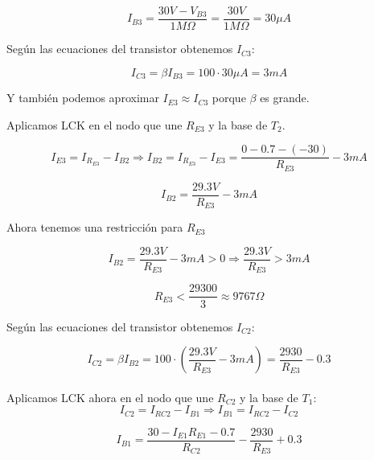 \begin{equation*}
  I_{B3} = \frac{30V - V_{B3}}{1M\Omega} = \frac{30V}{1M\Omega} = 30\mu A
\end{equation*}

Según las ecuaciones del transistor obtenemos $I_{C3}$:

\begin{equation*}
  I_{C3} = \beta I_{B3} = 100 \cdot 30\mu A = 3mA
\end{equation*}

Y también podemos aproximar $I_{E3} \approx I_{C3}$ porque $\beta$ es grande.

Aplicamos LCK en el nodo que une $R_{E3}$ y la base de $T_2$.

\begin{equation*}
  I_{E3} = I_{R_{E3}} - I_{B2}\Rightarrow
  I_{B2} = I_{R_{E3}} - I_{E3} = \frac{0 - 0.7 - (-30)}{R_{E3}} - 3mA
\end{equation*}

\begin{equation*}
  I_{B2} = \frac{29.3V}{R_{E3}} - 3mA
\end{equation*}

Ahora tenemos una restricción para $R_{E3}$

\begin{equation*}
  I_{B2} = \frac{29.3V}{R_{E3}} - 3mA > 0 \Rightarrow
  \frac{29.3V}{R_{E3}} > 3mA
\end{equation*}

\begin{equation*}
  R_{E3} < \frac{29300}{3} \approx 9767\Omega
\end{equation*}

Según las ecuaciones del transistor obtenemos $I_{C2}$:

\begin{equation*}
  I_{C2} = \beta I_{B2} =
  100 \cdot \left( \frac{29.3V}{R_{E3}} - 3mA \right) =
  \frac{2930}{R_{E3}} - 0.3
\end{equation*}
\\

Aplicamos LCK ahora en el nodo que une $R_{C2}$ y la base de $T_1$:
\begin{equation*}
  I_{C2} = I_{RC2} - I_{B1} \Rightarrow I_{B1} = I_{RC2} - I_{C2}
\end{equation*}

\begin{equation*}
  I_{B1} = \frac{30 - I_{E1} R_{E1} - 0.7}{R_{C2}} - \frac{2930}{R_{E3}} + 0.3
\end{equation*}

